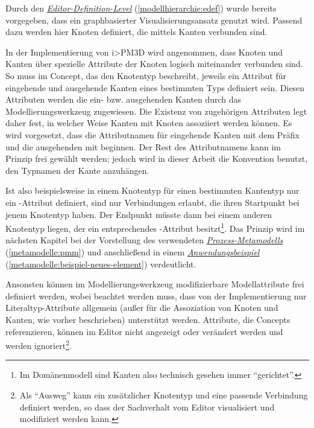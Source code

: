 \documentclass[a4paper,10pt]{sphinxmanual}
\begin{document}
Durch den {\hyperref[modellhierarchie:edef]{\emph{Editor-Definition-Level}}} (\autoref*{modellhierarchie:edef}) wurde bereits vorgegeben, dass ein graphbasierter Visualisierungsansatz genutzt wird.
Passend dazu werden hier Knoten definiert, die mittels Kanten verbunden sind.

In der Implementierung von i\textgreater{}PM3D wird angenommen, dass Knoten und Kanten über spezielle Attribute der Knoten logisch miteinander verbunden sind.
So muss im Concept, das den Knotentyp beschreibt, jeweils ein Attribut für eingehende und ausgehende Kanten eines bestimmten Typs definiert sein.
Diesen Attributen werden die ein- bzw. ausgehenden Kanten durch das Modellierungswerkzeug zugewiesen.
Die Existenz von zugehörigen Attributen legt daher fest, in welcher Weise Kanten mit Knoten assoziiert werden können.
Es wird vorgesetzt, dass die Attributnamen für eingehende Kanten mit dem Präfix  und die ausgehenden mit  beginnen.
Der Rest des Attributnamens kann im Prinzip frei gewählt werden; jedoch wird in dieser Arbeit die Konvention benutzt, den Typnamen der Kante anzuhängen.

Ist also beispielsweise in einem Knotentyp für einen bestimmten Kantentyp nur ein -Attribut definiert, sind nur Verbindungen erlaubt, die ihren Startpunkt bei jenem Knotentyp haben.
Der Endpunkt müsste dann bei einem anderen Knotentyp liegen, der ein entsprechendes -Attribut besitzt\footnote{
Im Domänenmodell sind Kanten also technisch gesehen immer "`gerichtet"'.
}.
Das Prinzip wird im nächsten Kapitel bei der Vorstellung des verwendeten {\hyperref[metamodelle:pmm]{\emph{Prozess-Metamodells}}} (\autoref*{metamodelle:pmm}) und anschließend in einem {\hyperref[metamodelle:beispiel-neues-element]{\emph{Anwendungsbeispiel}}} (\autoref*{metamodelle:beispiel-neues-element}) verdeutlicht.

Ansonsten können im Modellierungswerkzeug modifizierbare Modellattribute frei definiert werden, wobei beachtet werden muss, dass von der Implementierung nur Literaltyp-Attribute allgemein (außer für die Assoziation von Knoten und Kanten, wie vorher beschrieben) unterstützt werden.
Attribute, die Concepts referenzieren, können im Editor nicht angezeigt oder verändert werden und werden ignoriert\footnote{
Als "`Ausweg"' kann ein zusätzlicher Knotentyp und eine passende Verbindung definiert werden, so dass der Sachverhalt vom Editor visualisiert und modifiziert werden kann.
}.
\end{document}
